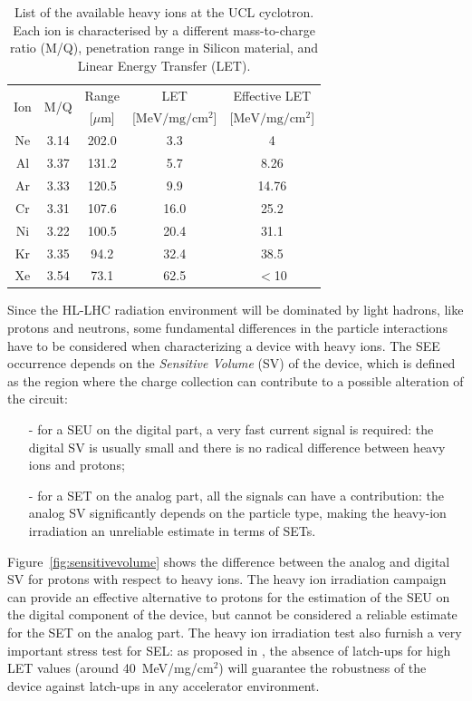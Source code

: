 \begin{table}
    \centering
    \begin{tabular}{c | c | c | c | c}
        \hline
        \hline
        \multirow{2}{*}{Ion} & \multirow{2}{*}{M/Q} & Range & LET & Effective LET \\
        &  & [$\mu$m] & [$\textrm{MeV}/\textrm{mg}/\textrm{cm}^2$] & [$\textrm{MeV}/\textrm{mg}/\textrm{cm}^2$] \\
        \hline
        Ne & 3.14 & 202.0 & 3.3 & 4 \\
        Al & 3.37 & 131.2 & 5.7 & 8.26 \\
        Ar & 3.33 & 120.5 & 9.9 & 14.76 \\
        Cr & 3.31 & 107.6 & 16.0 & 25.2 \\
        Ni & 3.22 & 100.5 & 20.4 & 31.1 \\
        Kr & 3.35 & 94.2 & 32.4 & 38.5 \\
        Xe & 3.54 & 73.1 & 62.5 & $<$10 \\
        \hline
        \hline
    \end{tabular}
    \caption{List of the available heavy ions at the UCL cyclotron. Each ion is characterised by a different mass-to-charge ratio (M/Q), penetration range in Silicon material, and Linear Energy Transfer (LET).}
    \label{tab:SEE_Ions}
\end{table}

\bigbreak

Since the HL-LHC radiation environment will be dominated by light hadrons, like protons and neutrons, some fundamental differences in the particle interactions have to be considered when characterizing a device with heavy ions.
The SEE occurrence depends on the \textit{Sensitive Volume} (SV) of the device, which is defined as the region where the charge collection can contribute to a possible alteration of the circuit:
\begin{itemize}
    \item [-] for a SEU on the digital part, a very fast current signal is required: the digital SV is usually small and there is no radical difference between heavy ions and protons;
    \item [-] for a SET on the analog part, all the signals can have a contribution: the analog SV significantly depends on the particle type, making the heavy-ion irradiation an unreliable estimate in terms of SETs.
\end{itemize}

Figure~\ref{fig:sensitivevolume} shows the difference between the analog and digital SV for protons with respect to heavy ions.
The heavy ion irradiation campaign can provide an effective alternative to protons for the estimation of the SEU on the digital component of the device, but cannot be considered a reliable estimate for the SET on the analog part.
The heavy ion irradiation test also furnish a very important stress test for SEL: as proposed in \cite{federico}, the absence of latch-ups for high LET values (around 40~MeV/mg/$\textrm{cm}^2$) will guarantee the robustness of the device against latch-ups in any accelerator environment.

